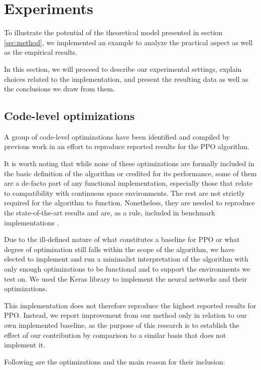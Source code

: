 \section{Experiments}
\label{sec:exp}
	To illustrate the potential of the theoretical model presented in section \ref{sec:method}, we implemented an example to analyze the practical aspect as well as the empirical results.

In this section, we will proceed to describe our experimental settings, explain choices related to the implementation, and present the resulting data as well as the conclusions we draw from them.

\subsection{Code-level optimizations}

A group of code-level optimizations have been identified and compiled by previous work \cite{engstrom2020implementation}\cite{shengyi2022the37implementation} in an effort to reproduce reported results for the PPO algorithm. 

It is worth  noting that while none of these optimizations are formally included in the basic definition of the algorithm or credited for its performance, some of them are a de-facto part of any functional implementation, especially those that relate to compatibility with  continuous space environments. The rest are not strictly required for the algorithm to function. Nonetheless, they are needed to reproduce the state-of-the-art results and are, as a rule, included in benchmark implementations \cite{huang2021cleanrl} \cite{baselines}.

Due to the ill-defined nature of what constitutes a baseline for PPO or what degree of optimization still falls within the scope of the algorithm, we have elected to implement and run a minimalist interpretation of the algorithm with only enough optimizations to be functional and to support the environments we test on. We used the Keras library to implement the neural networks and their optimizations.

This implementation does not therefore reproduce the highest reported results for PPO. Instead, we report improvement from our method only in relation to our own implemented baseline, as the purpose of this research is to establish the effect of our contribution by comparison to a similar basis that does not implement it.

Following are the optimizations and the main reason for their inclusion:

